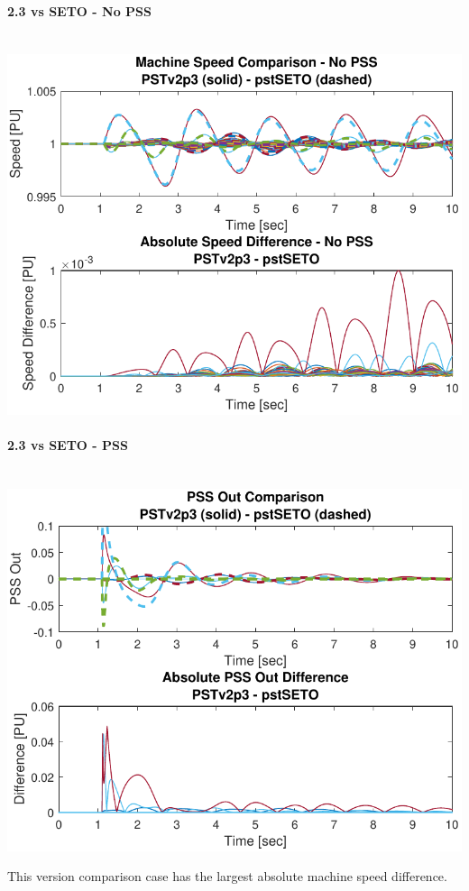 \documentclass[12pt]{article}
\begin{document}
\begin{landscape}
\begin{multicols}{3}
\vfill\null
\columnbreak

\paragraph{2.3 vs SETO - No PSS} \ \\

\includegraphics[width=\linewidth]{seto2noPSS}

\paragraph{2.3 vs SETO - PSS} \ \\
\includegraphics[width=\linewidth]{seto2PSS}

This version comparison case has the largest absolute machine speed difference.


\vfill\null
\end{multicols}


\end{landscape}
\end{document}
